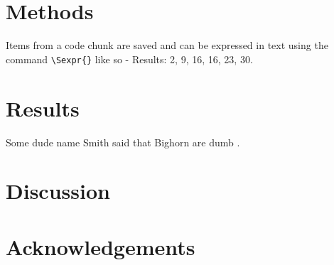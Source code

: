 \documentclass{article}\usepackage[]{graphicx}\usepackage[]{xcolor}
\begin{document}
\section*{Methods}



Items from a code chunk are saved and can be expressed in text using the command \texttt{\textbackslash{}Sexpr\{\}} like so - Results: 2, 9, 16, 16, 23, 30.



\section*{Results}

Some dude name Smith said that Bighorn are dumb \citep{smithEtAl02}.

\section*{Discussion}

\section*{Acknowledgements}


\newpage

\end{document}
